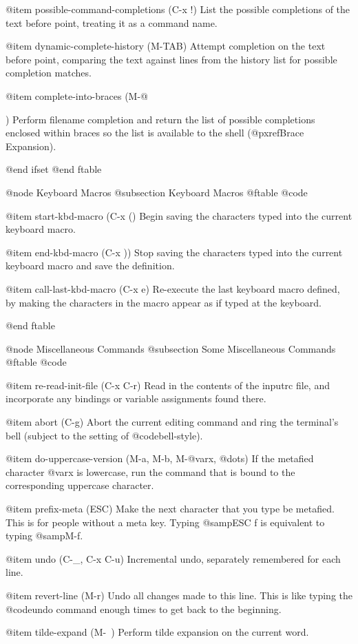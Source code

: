 {{@item possible-command-completions (C-x !)
List the possible completions of the text before point,
treating it as a command name.

@item dynamic-complete-history (M-TAB)
Attempt completion on the text before point, comparing
the text against lines from the history list for possible
completion matches.

@item complete-into-braces (M-@{)
Perform filename completion and return the list of possible completions
enclosed within braces so the list is available to the shell
(@pxref{Brace Expansion}).

@end ifset
@end ftable

@node Keyboard Macros
@subsection Keyboard Macros
@ftable @code

@item start-kbd-macro (C-x ()
Begin saving the characters typed into the current keyboard macro.

@item end-kbd-macro (C-x ))
Stop saving the characters typed into the current keyboard macro
and save the definition.

@item call-last-kbd-macro (C-x e)
Re-execute the last keyboard macro defined, by making the characters
in the macro appear as if typed at the keyboard.

@end ftable

@node Miscellaneous Commands
@subsection Some Miscellaneous Commands
@ftable @code

@item re-read-init-file (C-x C-r)
Read in the contents of the inputrc file, and incorporate
any bindings or variable assignments found there.

@item abort (C-g)
Abort the current editing command and
ring the terminal's bell (subject to the setting of
@code{bell-style}).

@item do-uppercase-version (M-a, M-b, M-@var{x}, @dots{})
If the metafied character @var{x} is lowercase, run the command
that is bound to the corresponding uppercase character.

@item prefix-meta (ESC)
Make the next character that you type be metafied.  This is for people
without a meta key.  Typing @samp{ESC f} is equivalent to typing
@samp{M-f}.

@item undo (C-_, C-x C-u)
Incremental undo, separately remembered for each line.

@item revert-line (M-r)
Undo all changes made to this line.  This is like typing the @code{undo}
command enough times to get back to the beginning.

@item tilde-expand (M-~)
Perform tilde expansion on the current word.

}}}
